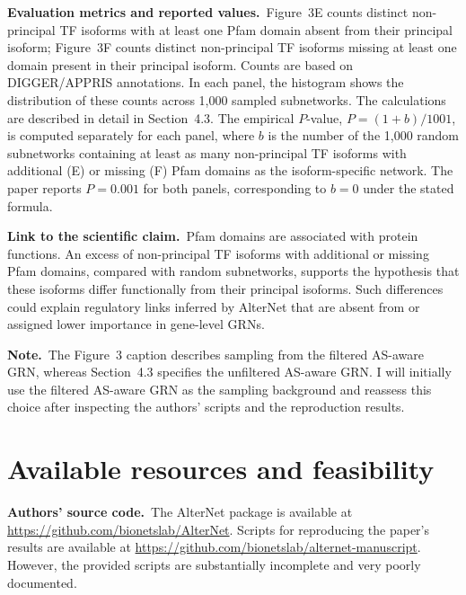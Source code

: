 \documentclass[a4paper,11pt]{article}
\newcommand{\field}[2]{\textbf{#1}\ #2\par}
\begin{document}
\field{Evaluation metrics and reported values.}{Figure~3E counts distinct non-principal TF isoforms with at least one Pfam domain absent from their principal isoform; Figure~3F counts distinct non-principal TF isoforms missing at least one domain present in their principal isoform. Counts are based on DIGGER/APPRIS annotations. In each panel, the histogram shows the distribution of these counts across 1,000 sampled subnetworks. The calculations are described in detail in Section~4.3. The empirical \(P\)-value, \(P=(1+b)/1001\), is computed separately for each panel, where \(b\) is the number of the 1,000 random subnetworks containing at least as many non-principal TF isoforms with additional (E) or missing (F) Pfam domains as the isoform-specific network. The paper reports \(P=0.001\) for both panels, corresponding to \(b=0\) under the stated formula.}

\field{Link to the scientific claim.}{Pfam domains are associated with protein functions. An excess of non-principal TF isoforms with additional or missing Pfam domains, compared with random subnetworks, supports the hypothesis that these isoforms differ functionally from their principal isoforms. Such differences could explain regulatory links inferred by AlterNet that are absent from or assigned lower importance in gene-level GRNs.}

\field{Note.}{The Figure~3 caption describes sampling from the filtered AS-aware GRN, whereas Section~4.3 specifies the unfiltered AS-aware GRN. I will initially use the filtered AS-aware GRN as the sampling background and reassess this choice after inspecting the authors' scripts and the reproduction results.}

\newpage
\section{Available resources and feasibility}

\field{Authors' source code.}{The AlterNet package is available at \url{https://github.com/bionetslab/AlterNet}. Scripts for reproducing the paper's results are available at \url{https://github.com/bionetslab/alternet-manuscript}. However, the provided scripts are substantially incomplete and very poorly documented.}
\end{document}
